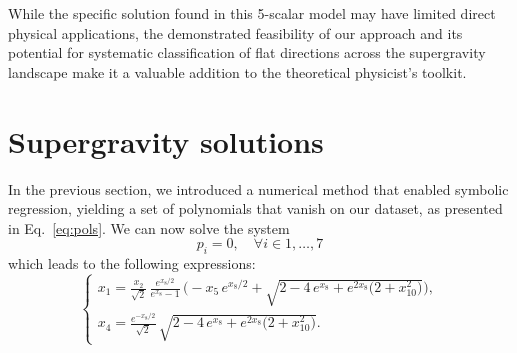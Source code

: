 \documentclass[11pt]{article}
\newcommand{\ce}[1]{\marginpar{\parbox{\marginparwidth}{\boldmath $\Longleftarrow$}}{\boldmath\bfseries (ce: #1)}}
\begin{document}
While the specific solution found in this 5-scalar model may have limited direct physical applications, the demonstrated feasibility of our approach and its potential for systematic classification of flat directions across the supergravity landscape make it a valuable addition to the theoretical physicist's toolkit.




\appendix
\section{Supergravity solutions}


In the previous section, we introduced a numerical method that enabled symbolic regression, yielding a set of polynomials that vanish on our dataset, as presented in Eq.~\ref{eq:pols}. We can now solve the system
\begin{equation}\label{eq:solvepol}
	p_i = 0, \quad \forall i \in {1,\dots,7}
\end{equation}
which leads to the following expressions:
\begin{equation}
	\begin{cases}
		\displaystyle x_{1} = \frac{x_{2}}{\sqrt{2}}\,\frac{e^{x_{8}/2}}{e^{x_{8}}-1}\,\Big(-x_{5}\,e^{x_{8}/2} + \sqrt{2-4\,e^{x_{8}}+e^{2x_{8}}\big(2+x_{10}^{2}\big)}\Big),\\[8pt]
		\displaystyle x_{4} = \frac{e^{-x_{8}/2}}{\sqrt{2}}\,\sqrt{2-4\,e^{x_{8}}+e^{2x_{8}}\big(2+x_{10}^{2}\big)}.
	\end{cases}
\end{equation}
\end{document}
